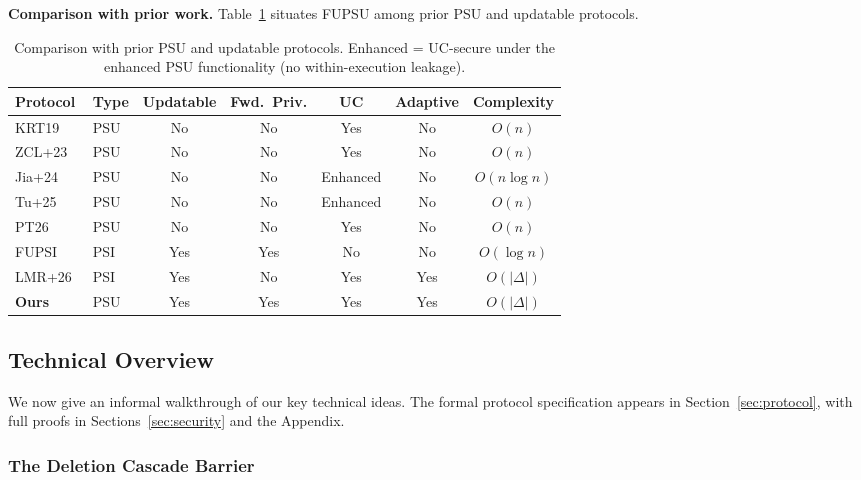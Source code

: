 \smallskip
\noindent\textbf{Comparison with prior work.}
Table~\ref{tab:intro-compare} situates FUPSU among prior PSU and
updatable protocols.

\begin{table}[t]
\centering
\footnotesize
\begin{tabular}{|l|l|c|c|c|c|c|}
\hline
\textbf{Protocol} & \textbf{Type} & \textbf{Updatable} & \textbf{Fwd.\ Priv.} & \textbf{UC} & \textbf{Adaptive} & \textbf{Complexity} \\
\hline\noalign{\vspace{-1pt}}\hline
KRT19~\cite{KRT19}   & PSU & No  & No  & Yes & No  & $O(n)$ \\
ZCL+23~\cite{ZCL+23} & PSU & No  & No  & Yes & No  & $O(n)$ \\
Jia+24~\cite{Jia+24} & PSU & No  & No  & Enhanced & No  & $O(n \log n)$ \\
Tu+25~\cite{Tu+25}   & PSU & No  & No  & Enhanced & No  & $O(n)$ \\
PT26~\cite{PT26}     & PSU & No  & No  & Yes & No  & $O(n)$ \\
FUPSI~\cite{WZC+24}  & PSI & Yes & Yes & No  & No  & $O(\log n)$ \\
LMR+26~\cite{LMR+26} & PSI & Yes & No  & Yes & Yes & $O(|\Delta|)$ \\
\hline\noalign{\vspace{-1pt}}\hline
\textbf{Ours} & PSU & Yes & Yes & Yes & Yes & $O(|\Delta|)$ \\
\hline
\end{tabular}

\smallskip
\caption{Comparison with prior PSU and updatable protocols.
Enhanced = UC-secure under the enhanced PSU functionality (no within-execution leakage).}
\label{tab:intro-compare}
\end{table}


\subsection{Technical Overview}

We now give an informal walkthrough of our key technical ideas. The formal protocol specification appears in Section~\ref{sec:protocol}, with full proofs in Sections~\ref{sec:security} and the Appendix.

\subsubsection{The Deletion Cascade Barrier}\label{sec:cascade-barrier}

